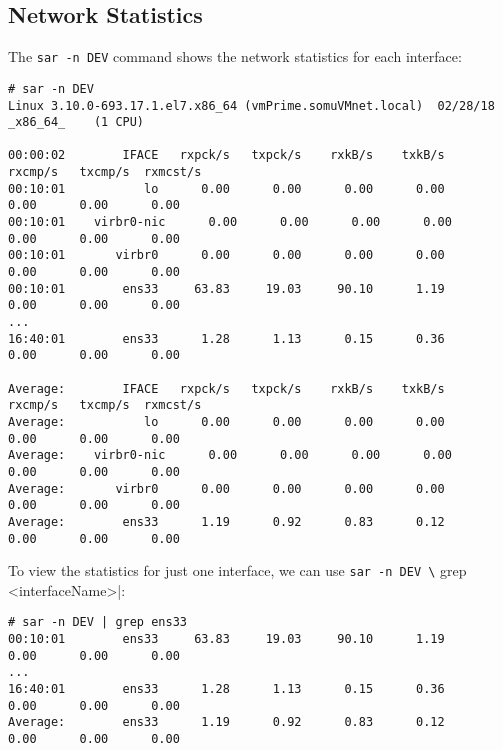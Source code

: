 \subsection{Network Statistics}
The \verb|sar -n DEV| command shows the network statistics for each interface:

\vspace{-15pt}
\begin{verbatim}
# sar -n DEV
Linux 3.10.0-693.17.1.el7.x86_64 (vmPrime.somuVMnet.local) 	02/28/18 	_x86_64_	(1 CPU)

00:00:02        IFACE   rxpck/s   txpck/s    rxkB/s    txkB/s   rxcmp/s   txcmp/s  rxmcst/s
00:10:01           lo      0.00      0.00      0.00      0.00      0.00      0.00      0.00
00:10:01    virbr0-nic      0.00      0.00      0.00      0.00      0.00      0.00      0.00
00:10:01       virbr0      0.00      0.00      0.00      0.00      0.00      0.00      0.00
00:10:01        ens33     63.83     19.03     90.10      1.19      0.00      0.00      0.00
...
16:40:01        ens33      1.28      1.13      0.15      0.36      0.00      0.00      0.00

Average:        IFACE   rxpck/s   txpck/s    rxkB/s    txkB/s   rxcmp/s   txcmp/s  rxmcst/s
Average:           lo      0.00      0.00      0.00      0.00      0.00      0.00      0.00
Average:    virbr0-nic      0.00      0.00      0.00      0.00      0.00      0.00      0.00
Average:       virbr0      0.00      0.00      0.00      0.00      0.00      0.00      0.00
Average:        ens33      1.19      0.92      0.83      0.12      0.00      0.00      0.00
\end{verbatim}
\vspace{-10pt}	

\noindent
To view the statistics for just one interface, we can use \verb|sar -n DEV \| grep <interfaceName>|:

\vspace{-15pt}
\begin{verbatim}
# sar -n DEV | grep ens33
00:10:01        ens33     63.83     19.03     90.10      1.19      0.00      0.00      0.00
...
16:40:01        ens33      1.28      1.13      0.15      0.36      0.00      0.00      0.00
Average:        ens33      1.19      0.92      0.83      0.12      0.00      0.00      0.00
\end{verbatim}